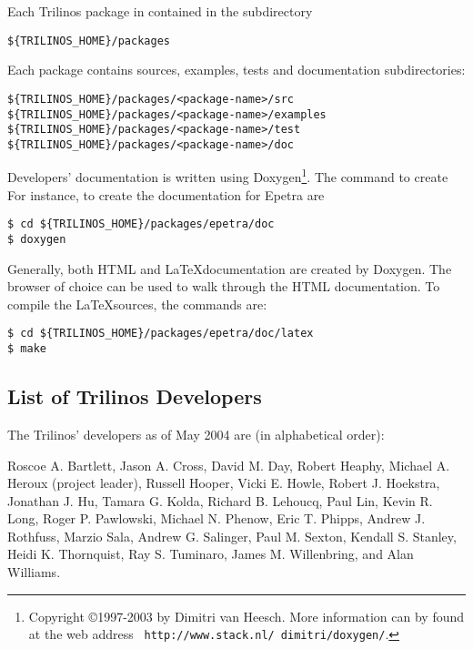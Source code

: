 Each Trilinos package in contained in the subdirectory
\begin{verbatim}
${TRILINOS_HOME}/packages
\end{verbatim}
Each package contains sources, examples, tests and documentation subdirectories:
\begin{verbatim}
${TRILINOS_HOME}/packages/<package-name>/src
${TRILINOS_HOME}/packages/<package-name>/examples
${TRILINOS_HOME}/packages/<package-name>/test
${TRILINOS_HOME}/packages/<package-name>/doc
\end{verbatim}
Developers' documentation is written using Doxygen\footnote{Copyright
  \copyright 1997-2003 by Dimitri van Heesch. More information can by
  found at the web address {\tt
    http://www.stack.nl/~dimitri/doxygen/}.}. The command to create For
instance, to create the documentation for Epetra are
\begin{verbatim}
$ cd ${TRILINOS_HOME}/packages/epetra/doc
$ doxygen
\end{verbatim}
Generally, both HTML and \LaTeX documentation are created by Doxygen.
The browser of choice can be used to walk through the HTML
documentation.  To compile the \LaTeX sources, the commands are:
\begin{verbatim}
$ cd ${TRILINOS_HOME}/packages/epetra/doc/latex
$ make
\end{verbatim}


\subsection{List of Trilinos Developers}
\label{sec:intro_incomplete}

The Trilinos' developers as of May 2004 are (in alphabetical order):

Roscoe A. Bartlett,
Jason A. Cross,
David M. Day,
Robert Heaphy,
Michael A. Heroux (project leader),
Russell Hooper,
Vicki E. Howle,
Robert J. Hoekstra,
Jonathan J. Hu,
Tamara G. Kolda,
Richard B. Lehoucq,
Paul Lin,
Kevin R. Long,
Roger P. Pawlowski,
Michael N. Phenow,
Eric T. Phipps,
Andrew J. Rothfuss,
Marzio Sala,
Andrew G. Salinger,
Paul M. Sexton,
Kendall S. Stanley,
Heidi K. Thornquist,
Ray S. Tuminaro,
James M. Willenbring, and
Alan Williams.

